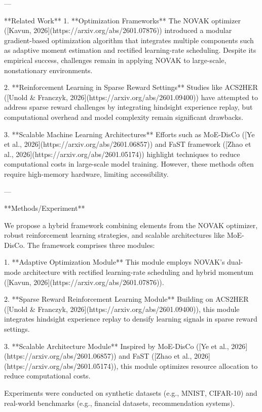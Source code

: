 ---

**Related Work**  
1. **Optimization Frameworks**  
The NOVAK optimizer ([Kavun, 2026](https://arxiv.org/abs/2601.07876)) introduced a modular gradient-based optimization algorithm that integrates multiple components such as adaptive moment estimation and rectified learning-rate scheduling. Despite its empirical success, challenges remain in applying NOVAK to large-scale, nonstationary environments.  

2. **Reinforcement Learning in Sparse Reward Settings**  
Studies like ACS2HER ([Unold & Franczyk, 2026](https://arxiv.org/abs/2601.09400)) have attempted to address sparse reward challenges by integrating hindsight experience replay, but computational overhead and model complexity remain significant drawbacks.  

3. **Scalable Machine Learning Architectures**  
Efforts such as MoE-DisCo ([Ye et al., 2026](https://arxiv.org/abs/2601.06857)) and FaST framework ([Zhao et al., 2026](https://arxiv.org/abs/2601.05174)) highlight techniques to reduce computational costs in large-scale model training. However, these methods often require high-memory hardware, limiting accessibility.  

---

**Methods/Experiment**  

We propose a hybrid framework combining elements from the NOVAK optimizer, robust reinforcement learning strategies, and scalable architectures like MoE-DisCo. The framework comprises three modules:  

1. **Adaptive Optimization Module**  
This module employs NOVAK's dual-mode architecture with rectified learning-rate scheduling and hybrid momentum ([Kavun, 2026](https://arxiv.org/abs/2601.07876)).  

2. **Sparse Reward Reinforcement Learning Module**  
Building on ACS2HER ([Unold & Franczyk, 2026](https://arxiv.org/abs/2601.09400)), this module integrates hindsight experience replay to densify learning signals in sparse reward settings.  

3. **Scalable Architecture Module**  
Inspired by MoE-DisCo ([Ye et al., 2026](https://arxiv.org/abs/2601.06857)) and FaST ([Zhao et al., 2026](https://arxiv.org/abs/2601.05174)), this module optimizes resource allocation to reduce computational costs.  

Experiments were conducted on synthetic datasets (e.g., MNIST, CIFAR-10) and real-world benchmarks (e.g., financial datasets, recommendation systems).  

